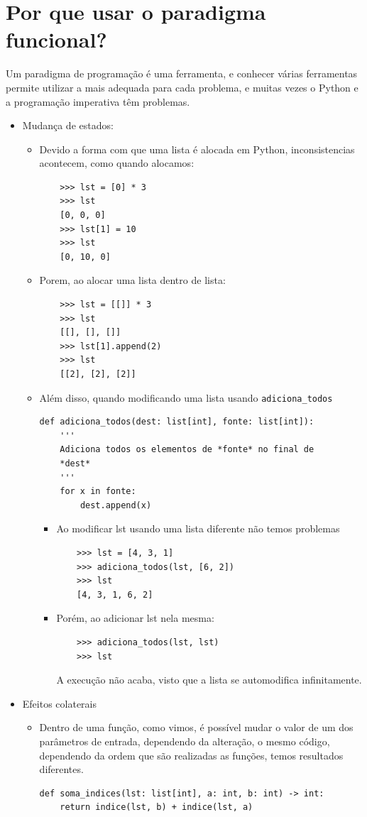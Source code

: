 \documentclass[12pt]{article}
\begin{document}
\section{Por que usar o paradigma funcional?}
Um paradigma de programação é uma ferramenta, e conhecer várias ferramentas 
permite utilizar a mais adequada para cada problema, e muitas vezes o Python e 
a programação imperativa têm problemas.
\begin{itemize}
    \item Mudança de estados:
    \begin{itemize}
        \item Devido a forma com que uma lista é alocada em Python, 
        inconsistencias acontecem, como quando alocamos:
        \begin{verbatim}
    >>> lst = [0] * 3
    >>> lst
    [0, 0, 0]
    >>> lst[1] = 10
    >>> lst
    [0, 10, 0]
        \end{verbatim}
        \item Porem, ao alocar uma lista dentro de lista:
        \begin{verbatim}
    >>> lst = [[]] * 3
    >>> lst
    [[], [], []]
    >>> lst[1].append(2)
    >>> lst
    [[2], [2], [2]]
        \end{verbatim}
        \item Além disso, quando modificando uma lista usando 
        \verb|adiciona_todos|
        \begin{verbatim}
def adiciona_todos(dest: list[int], fonte: list[int]):
    ''' 
    Adiciona todos os elementos de *fonte* no final de 
    *dest* 
    '''
    for x in fonte:
        dest.append(x)
        \end{verbatim}
        \begin{itemize}
            \item Ao modificar lst usando uma lista diferente não temos 
            problemas
            \begin{verbatim}
    >>> lst = [4, 3, 1]
    >>> adiciona_todos(lst, [6, 2])
    >>> lst
    [4, 3, 1, 6, 2]
            \end{verbatim}
            \item Porém, ao adicionar lst nela mesma:
            \begin{verbatim}
    >>> adiciona_todos(lst, lst)
    >>> lst
            \end{verbatim}
            A execução não acaba, visto que a lista se automodifica 
            infinitamente.
        \end{itemize}
    \end{itemize}
    \item Efeitos colaterais
    \begin{itemize}
        \item Dentro de uma função, como vimos, é possível mudar o valor de 
        um dos parâmetros de entrada, dependendo da alteração, o mesmo 
        código, dependendo da ordem que são realizadas as funções, temos 
        resultados diferentes.
        \begin{verbatim}
def soma_indices(lst: list[int], a: int, b: int) -> int:
    return indice(lst, b) + indice(lst, a)


\end{verbatim}
\end{itemize}
\end{itemize}
\end{document}
